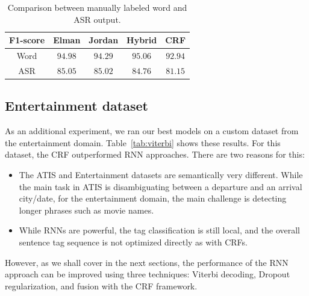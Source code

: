 \begin{table}
\centering
\begin{tabular}{|c|c|c|c|c|}
\hline
F1-score &   Elman &  Jordan &  Hybrid & CRF \\
\hline
Word    & $94.98$ &  $94.29$ &  $95.06$ &  $92.94$ \\
ASR & $85.05$ &   $85.02$  & $84.76$ &   $81.15$ \\
\hline
\end{tabular}
\caption{Comparison between manually labeled word and ASR output.}
\label{tab:asr}
\end{table}


\subsection{Entertainment dataset}

As an additional experiment, we ran our best models on a custom dataset from
the entertainment domain. Table~\ref{tab:viterbi} shows these results. For this
dataset, the CRF outperformed RNN approaches. There are two reasons for this:

\begin{itemize}

\item   The ATIS and Entertainment datasets are semantically very different.
While the main task in ATIS is disambiguating between a departure and an
arrival city/date, for the entertainment domain, the main challenge is
detecting longer phrases such as movie names.

\item   While RNNs are powerful, the tag classification is still local, and the
overall sentence tag sequence is not optimized directly as with CRFs.

\end{itemize}

However, as we shall cover in the next sections, the performance of the RNN
approach can be improved using three techniques: Viterbi decoding, Dropout
regularization, and fusion with the CRF framework.


